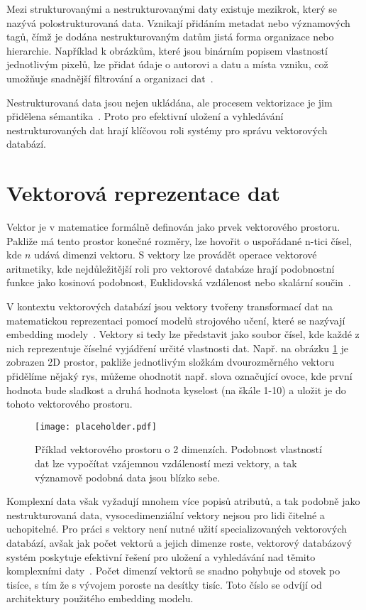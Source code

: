 Mezi strukturovanými a nestrukturovanými daty existuje mezikrok, který se nazývá polostrukturovaná data. Vznikají přidáním metadat nebo významových tagů, čímž je dodána nestrukturovaným datům jistá forma organizace nebo hierarchie. Například k obrázkům, které jsou binárním popisem vlastností jednotlivým pixelů, lze přidat údaje o autorovi a datu a místa vzniku, což umožňuje snadnější filtrování a organizaci dat~\cite{semi-structured}.

Nestrukturovaná data jsou nejen ukládána, ale procesem vektorizace je jim přidělena sémantika~\cite{vdbms}. Proto pro efektivní uložení a vyhledávání nestrukturovaných dat hrají klíčovou roli systémy pro správu vektorových databází.
 
\section{Vektorová reprezentace dat}
Vektor je v matematice formálně definován jako prvek vektorového prostoru. Pakliže má tento prostor konečné rozměry, lze hovořit o uspořádané n-tici čísel, kde $n$ udává dimenzi vektoru. S vektory lze provádět operace vektorové aritmetiky, kde nejdůležitější roli pro vektorové databáze hrají podobnostní funkce jako kosinová podobnost, Euklidovská vzdálenost nebo skalární součin~\cite{wolfram_vector}.

V kontextu vektorových databází jsou vektory tvořeny transformací dat na matematickou reprezentaci pomocí modelů strojového učení, které se nazývají embedding modely~\cite{compreh_survey_vdb}. Vektory si tedy lze představit jako soubor čísel, kde každé z nich reprezentuje číselné vyjádření určité vlastnosti dat. Např. na obrázku \ref{fig:vector2D} je zobrazen 2D prostor, pakliže jednotlivým složkám dvourozměrného vektoru přidělíme nějaký rys, můžeme ohodnotit např. slova označující ovoce, kde první hodnota bude sladkost a druhá hodnota kyselost (na škále 1-10) a uložit je do tohoto vektorového prostoru.

\begin{figure}[H]
    \centering
    \texttt{[image: placeholder.pdf]}
    \caption{Příklad vektorového prostoru o 2 dimenzích. Podobnost vlastností dat lze vypočítat vzájemnou vzdáleností mezi vektory, a tak významově podobná data jsou blízko sebe.}
    \label{fig:vector2D}
\end{figure}

Komplexní data však vyžadují mnohem více popisů atributů, a tak podobně jako nestrukturovaná data, vysocedimenziální vektory nejsou pro lidi čitelné a uchopitelné. Pro práci s vektory není nutné užití specializovaných vektorových databází, avšak jak počet vektorů a jejich dimenze roste, vektorový databázový systém poskytuje efektivní řešení pro uložení a vyhledávání nad těmito komplexními daty~\cite{vdbms}. Počet dimenzí vektorů se snadno pohybuje od stovek po tisíce, s tím že s vývojem poroste na desítky tisíc. Toto číslo se odvíjí od architektury použitého embedding modelu.

